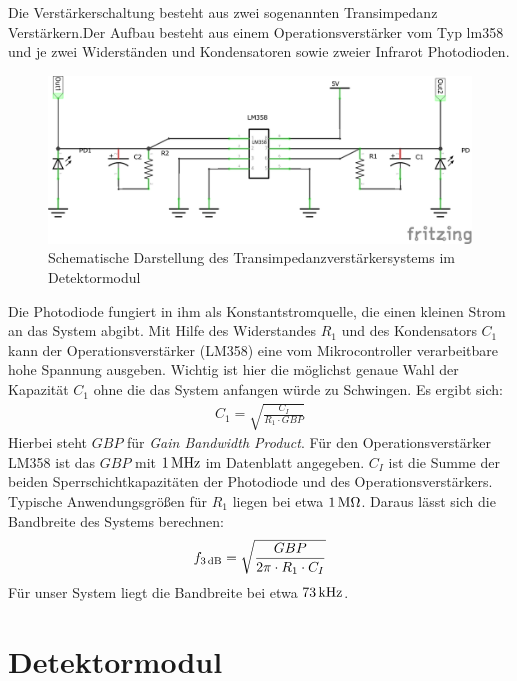 Die Verstärkerschaltung besteht aus zwei sogenannten Transimpedanz Verstärkern.Der Aufbau besteht aus einem Operationsverstärker vom Typ lm358 und je zwei Widerständen und Kondensatoren sowie zweier Infrarot Photodioden.  
\begin{figure}[h]
	\centering
	\includegraphics[scale=0.75]{../figures/Transimpedanz.png}
	\caption{Schematische Darstellung des Transimpedanzverstärkersystems im Detektormodul}
	\label{fig:Transimpedanz}
\end{figure}
Die Photodiode fungiert in ihm als Konstantstromquelle, die einen kleinen Strom an das System abgibt. Mit Hilfe des Widerstandes $R_1$ und des Kondensators $C_1$ kann der Operationsverstärker (LM358) eine vom Mikrocontroller verarbeitbare hohe Spannung ausgeben. Wichtig ist hier die möglichst genaue Wahl der Kapazität $C_1$ ohne die das System anfangen würde zu Schwingen. Es ergibt sich:
\begin{align*}
	C_1 = \sqrt{\frac{C_I}{R_1 \cdot GBP}}
\end{align*}
Hierbei steht $GBP$ für \textit{Gain Bandwidth Product}. Für den Operationsverstärker LM358 ist das $GBP$ mit $\unit[1]{MHz}$ im Datenblatt angegeben. $C_I$ ist die Summe der beiden Sperrschichtkapazitäten der Photodiode und des Operationsverstärkers. Typische Anwendungsgrößen für $R_1$ liegen bei etwa $\unit[1]{M\Omega}$. Daraus lässt sich die Bandbreite des Systems berechnen:
\begin{align*}
	f_{\unit[3]{dB}} = \sqrt{\frac{GBP}{2\pi \cdot R_1 \cdot C_I}}
\end{align*}
Für unser System liegt die Bandbreite bei etwa $\unit[73]{kHz}$. 




\section{Detektormodul}
\label{sec:Detektormodul}


